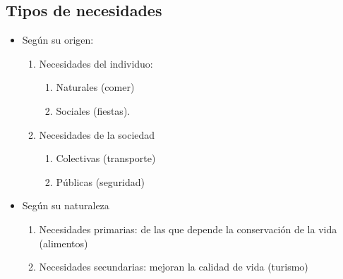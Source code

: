 \subsection{Tipos de necesidades}

\begin{itemize}
    \item Según su origen:
    \begin{enumerate}
        \item Necesidades del individuo: 
        \begin{enumerate}
            \item Naturales (comer)
            \item Sociales (fiestas).
        \end{enumerate}
        \item Necesidades de la sociedad 
        \begin{enumerate}
            \item Colectivas (transporte) 
            \item Públicas (seguridad)
        \end{enumerate}
    \end{enumerate}
    \item Según su naturaleza 
    \begin{enumerate}
        \item Necesidades primarias: de las que depende la conservación de la vida (alimentos)
        \item Necesidades secundarias: mejoran la calidad de vida (turismo)
    \end{enumerate}
\end{itemize}
